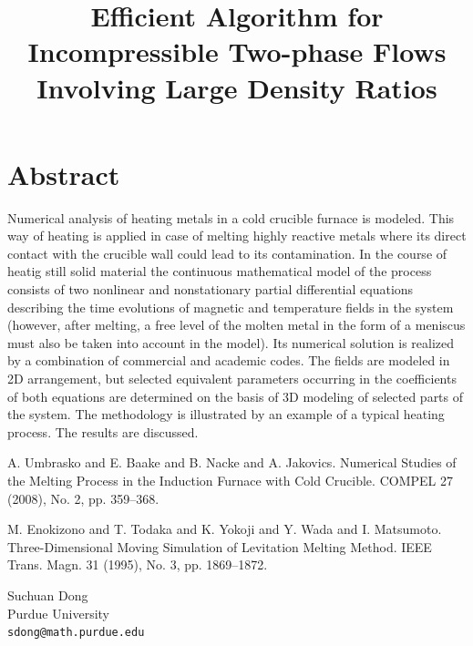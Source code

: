 \documentclass[article, A4, 11pt]{llncs}%
\begin{document}
\section*{Abstract}
Numerical analysis of heating metals in a cold crucible furnace is modeled. This way of heating is applied in case of melting highly reactive metals where its direct contact with the crucible wall could lead to its contamination. In the course of heatig still solid material the continuous mathematical model of the process consists of two nonlinear and nonstationary partial differential equations describing the time evolutions of magnetic and temperature fields in the system (however, after melting, a free level of the molten metal in the form of a meniscus must also be taken into account in the model). Its numerical solution is realized by a combination of commercial and academic codes. The fields are modeled in 2D arrangement, but selected equivalent parameters occurring in the coefficients of both equations are determined on the basis of 3D modeling of selected parts of the system. The methodology is illustrated by an example of a typical heating process. The results are discussed. 


\begin{thebibliography}{10}
{\sc A. Umbrasko and E. Baake and B. Nacke and A. Jakovics}. {Numerical Studies of the Melting Process in the Induction Furnace with Cold Crucible}. COMPEL 	27 (2008), No. 2, pp. 359--368.

{\sc M. Enokizono and T. Todaka and K. Yokoji and Y. Wada and I. Matsumoto}. {Three-Dimensional Moving Simulation of Levitation Melting Method}. IEEE Trans. Magn. 31 (1995), No. 3, pp. 1869--1872.
\end{thebibliography} %

\title{Efficient Algorithm for Incompressible Two-phase Flows Involving Large Density Ratios}
 \author{} \institute{}
\maketitle
\begin{center}
{\large Suchuan Dong}\\
Purdue University\\
{\tt sdong@math.purdue.edu}
\end{center}
\end{document}
